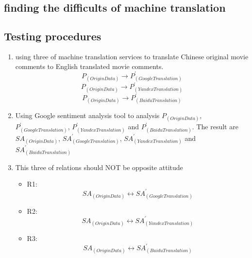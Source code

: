 \documentclass[conference]{IEEEtran}
\begin{document}
\subsection{finding the difficults of machine translation}
\subsection{Testing procedures}
\begin{enumerate}
    \item using three of machine translation services to translate Chinese
    original movie comments to English translated movie comments.
    $$P_{(Origin Data)} \rightarrow P^{\prime}_{(Google Translation)}$$
    $$P_{(Origin Data)} \rightarrow P^{\prime}_{(Yandex Translation)}$$
    $$P_{(Origin Data)} \rightarrow P^{\prime}_{(Baidu Translation)}$$
  \item Using Google sentiment analysis tool to analysis $P_{(Origin Data)}$,
    $P^{\prime}_{(Google Translation)}$, $ P^{\prime}_{(Yandex Translation)}$ and $
    P^{\prime}_{(Baidu Translation)}$. The result are $SA_{(Origin Data)}$,
    $SA^{\prime}_{(Google Translation)}$, $ SA^{\prime}_{(Yandex Translation)}$ and $
    SA^{\prime}_{(Baidu Translation)}$
  \item This three of relations should NOT be opposite attitude
\begin{itemize}
  \item R1: $$SA_{(Origin Data)} \longleftrightarrow SA^{\prime}_{(Google Translation)}$$
  \item R2: $$SA_{(Origin Data)} \longleftrightarrow SA^{\prime}_{(Yandex Translation)}$$
  \item R3: $$SA_{(Origin Data)} \longleftrightarrow SA^{\prime}_{(Baidu Translation)}$$
\end{itemize}

\end{enumerate}
\end{document}
